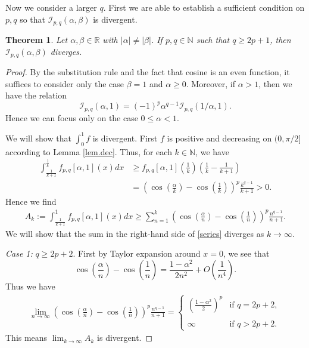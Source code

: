\documentclass[12pt, reqno]{amsart}
\theoremstyle{plain}
\newtheorem{theorem}{Theorem}[section]
\theoremstyle{definition}
\begin{document}
Now we consider a larger $q$. First we are able to establish a sufficient condition on $p, q$ so that $\mathcal{I}_{p, q}(\alpha, \beta)$ is divergent.


\begin{theorem}\label{divq>=2}
    Let $\alpha, \beta\in\mathbb{R}$ with $|\alpha|\ne|\beta|$. If $p, q\in\mathbb{N}$ such that $q\ge 2p+1$, then $\mathcal{I}_{p, q}(\alpha, \beta)$ diverges.
\end{theorem}
\begin{proof}
By the substitution rule and the fact that cosine is an even function, it suffices to consider only the case $\beta=1$ and $\alpha\ge 0$. Moreover, if $\alpha>1$, then we have the relation 
    \[\mathcal{I}_{p, q}(\alpha, 1)=(-1)^p\alpha^{q-1}\mathcal{I}_{p, q}(1/\alpha, 1).\]
    Hence we can focus only on the case $0\le \alpha<1$.
    
     We will show that $\int_0^1f$ is divergent. First $f$ is positive and decreasing on $(0, \pi/2]$ according to Lemma \ref{lem.dec}. Thus, for each $k\in\mathbb{N}$, we have
    \begin{align*}
        \int_{\frac{1}{k+1}}^{\frac{1}{k}}f_{p, q}[\alpha, 1](x)dx &\ge f_{p, q}[\alpha, 1]\left(\frac{1}{k}\right)\left(\frac{1}{k}-\frac{1}{k+1}\right)
        \\
        &=\left(\cos\left(\frac{\alpha}{k}\right)-\cos\left(\frac{1}{k}\right)\right)^p\frac{k^{q-1}}{k+1}>0.
    \end{align*}
    Hence we find
    \begin{align}\label{series}
        A_k:=\int_{\frac{1}{k+1}}^1f_{p, q}[\alpha, 1](x)dx\ge\sum_{n=1}^k\left(\cos\left(\frac{\alpha}{n}\right)-\cos\left(\frac{1}{n}\right)\right)^p\frac{n^{q-1}}{n+1}.
    \end{align}
    We will show that the sum in the right-hand side of \eqref{series} diverges as $k\to\infty$.
    
    {\it Case 1:} $q\ge 2p+2$. First by Taylor expansion around $x=0$, we see that
        \[\cos\left(\frac{\alpha}{n}\right)-\cos\left(\frac{1}{n}\right)=\frac{1-\alpha^2}{2n^2}+O\left(\frac{1}{n^4}\right).\]
    Thus we have
    \begin{align*}
        \lim_{n\to\infty}\left(\cos\left(\frac{\alpha}{n}\right)-\cos\left(\frac{1}{n}\right)\right)^p\frac{n^{q-1}}{n+1}=
        \begin{cases}
      \displaystyle\left(\frac{1-\alpha^2}{2}\right)^p  &\text{if } q=2p+2,\\\\
       \infty &\text{if } q>2p+2.
        \end{cases}
    \end{align*}
    This means $\lim_{k\to\infty}A_k$ is divergent.
    

\end{proof}
\end{document}

